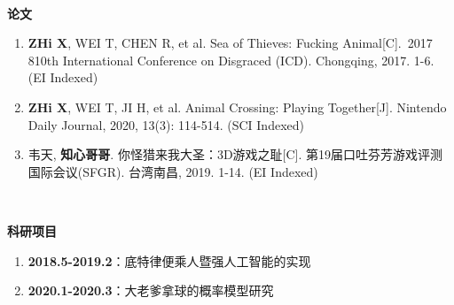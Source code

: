 

~~

\begin{flushleft} 
  \bfseries\large 论文\\
  \relax
\end{flushleft}

\begin{enumerate}
  \renewcommand{\labelenumi}{[\theenumi]}
  \item \textbf{ZHi X}, WEI T, CHEN R, et al. Sea of Thieves: Fucking Animal[C]. 2017 810th International Conference on Disgraced (ICD). Chongqing, 2017. 1-6. (EI Indexed)
  \item \textbf{ZHi X}, WEI T, JI H, et al. Animal Crossing: Playing Together[J]. Nintendo Daily Journal, 2020, 13(3): 114-514. (SCI Indexed)
  \item 韦天, \textbf{知心哥哥}. 你怪猎来我大圣：3D游戏之耻[C]. 第19届口吐芬芳游戏评测国际会议(SFGR). 台湾南昌, 2019. 1-14. (EI Indexed)
\end{enumerate}

~~

\begin{flushleft}
  \bfseries\large 科研项目\\
  \relax
\end{flushleft}

\begin{enumerate}
  \renewcommand{\labelenumi}{[\theenumi]}
  \item \textbf{2018.5-2019.2}：底特律便乘人暨强人工智能的实现
  \item \textbf{2020.1-2020.3}：大老爹拿球的概率模型研究
\end{enumerate}
